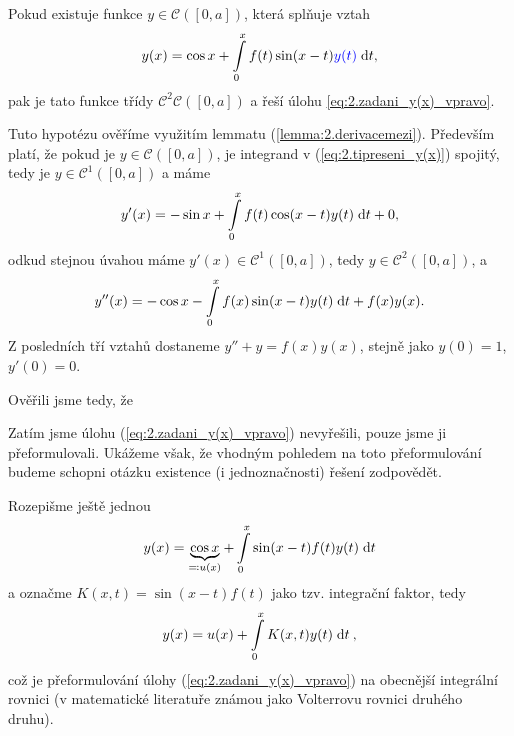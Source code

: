 Pokud existuje funkce $y\in \mathcal{C} \left( [0,a] \right)$, která splňuje vztah
\begin{equation}
    y(x) = \cos x + \int\limits_0^x f(t)\sin(x-t)\textcolor{blue}{y(t)}\;\mathrm{d}t,
    \label{eq:2.tipreseni_y(x)}
\end{equation}
pak je tato funkce třídy $\mathcal{C}^2 \mathcal{C} \left([0,a] \right)$ a řeší úlohu \eqref{eq:2.zadani_y(x)_vpravo}.

Tuto hypotézu ověříme využitím lemmatu (\ref{lemma:2.derivacemezi}). Především platí, že pokud je $y\in \mathcal{C} \left([0,a] \right)$, je integrand v (\ref{eq:2.tipreseni_y(x)}) spojitý, tedy je $y\in\mathcal{C}^1([0,a])$ a máme
\begin{equation}
    y'(x) = -\sin x + \int\limits_0^x f(t)\cos(x-t)y(t)\;\mathrm{d}t + 0,
\end{equation}
odkud stejnou úvahou máme $y'(x)\in\mathcal{C}^1([0,a])$, tedy $y\in\mathcal{C}^2([0,a])$, a 
\begin{equation}
    y''(x) = -\cos x -\int\limits_0^x f(x) \sin(x-t)y(t)\;\mathrm{d}t + f(x)y(x).
\end{equation}
Z posledních tří vztahů dostaneme $y''+y=f(x)y(x)$, stejně jako $y(0)=1$, $y'(0)=0$.

Ověřili jsme tedy, že
\begin{figure}[h!]
    \centering
\end{figure}

Zatím jsme úlohu (\ref{eq:2.zadani_y(x)_vpravo}) nevyřešili, pouze jsme ji přeformulovali. Ukážeme však, že vhodným pohledem na toto přeformulování budeme schopni otázku existence (i jednoznačnosti) řešení zodpovědět.

Rozepišme ještě jednou 
\begin{equation}
    y(x)=\underbrace{\cos x}_{\eqqcolon u(x)} + \int\limits_0^x \sin(x-t)f(t) y(t) \;\mathrm{d}t
\end{equation}
a označme $K(x,t) = \sin(x-t)f(t)$ jako tzv. integrační faktor, tedy
\begin{equation}
    y(x) = u(x) + \int\limits_0^xK(x,t)y(t)\;\mathrm{d}t \:,
    \label{eq:2.zadani_preformulovano}
\end{equation}
což je přeformulování úlohy (\ref{eq:2.zadani_y(x)_vpravo}) na obecnější integrální rovnici (v matematické literatuře známou jako Volterrovu rovnici druhého druhu).

